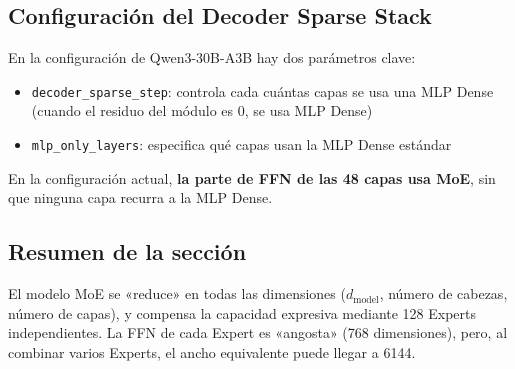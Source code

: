 \subsection{Configuración del Decoder Sparse Stack}

En la configuración de Qwen3-30B-A3B hay dos parámetros clave:
\begin{itemize}
  \item \texttt{decoder\_sparse\_step}: controla cada cuántas capas se usa una MLP Dense (cuando el residuo del módulo es 0, se usa MLP Dense)
  \item \texttt{mlp\_only\_layers}: especifica qué capas usan la MLP Dense estándar
\end{itemize}

En la configuración actual, \textbf{la parte de FFN de las 48 capas usa MoE}, sin que ninguna capa recurra a la MLP Dense.

\subsection{Resumen de la sección}

El modelo MoE se «reduce» en todas las dimensiones ($d_{\text{model}}$, número de cabezas, número de capas), y compensa la capacidad expresiva mediante 128 Experts independientes. La FFN de cada Expert es «angosta» (768 dimensiones), pero, al combinar varios Experts, el ancho equivalente puede llegar a 6144.

